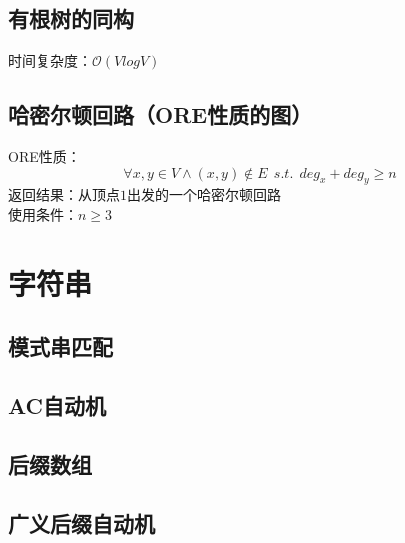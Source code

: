 \documentclass[openany, a4paper, 10pt]{book}
\begin{document}
\begin{spacing}{1.1}
		\section{有根树的同构}
			时间复杂度：$\mathcal{O}(V log V)$
			
		\section{哈密尔顿回路（ORE性质的图）}
			ORE性质：$$\forall x,y \in V \wedge (x,y) \notin E \ \ s.t. \ \ deg_x+deg_y \geq n$$
			\indent 返回结果：从顶点$1$出发的一个哈密尔顿回路\\
			\indent 使用条件：$n \geq 3$
			
	\chapter{字符串}
		\section{模式串匹配}
			
		\section{AC自动机}
			
		\section{后缀数组}
			
		\section{广义后缀自动机}
			

\end{spacing}
\end{document}
